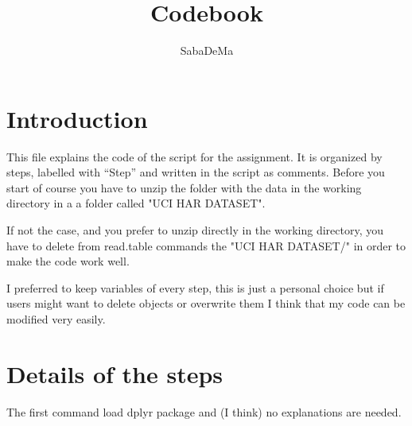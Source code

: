 \documentclass[11pt]{article}
\begin{document}
\title{Codebook}
\author{\textsf{SabaDeMa}}
\date{}
\maketitle
\section{Introduction}
This file explains the code of the script for the assignment. It is organized by steps, labelled with \textsf{``Step''} and written in the script as comments. Before you start of course you have to unzip the folder with the data in the working directory in a a folder called \textsf{"UCI HAR DATASET"}.

If not the case, and you prefer to unzip directly in the working directory, you have to delete from \textsf{read.table} commands the \textsf{"UCI HAR DATASET/"} in order to make the code work well.

I preferred to keep variables of every step, this is just a personal choice but if users might want to delete objects or overwrite them I think that my code can be modified very easily.

\section{Details of the steps}
The first command load \textsf{dplyr} package and (I think) no explanations are needed.
\end{document}
